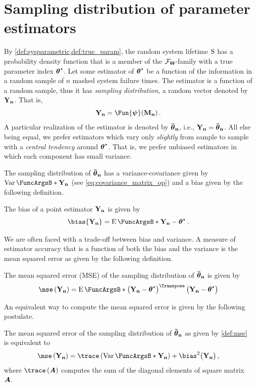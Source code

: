 \documentclass[
    11pt,
    extrafontsizes,
    article,
    oldfontcommands,
    final,
    oneside,
    openany,
    hidelinks]{memoir}
\begin{document}
\chapter{Sampling distribution of parameter estimators}
\label{sec:general_estimating_parameters:mle}
By \cref{def:sysparametric,def:true_param}, the random system lifetime $\mathrm{S}$ has a probability density function that is a member of the $\mathcal{F}_{\boldsymbol{\Theta}}$-family with a true parameter index ${\boldsymbol{\mathbf{\theta}}}^{\star}$. Let some estimator of ${\boldsymbol{\mathbf{\theta}}}^{\star}$ be a function of the information in a random sample of $n$ masked system failure times. The estimator is a function of a random sample, thus it has \emph{sampling distribution}, a random vector denoted by $\mathrm{\boldsymbol{\mathbf{Y_n}}}$. That is,
\begin{equation}
\sampdpt = \Fun{\vec{\psi}}(\mfs)\,.
\end{equation}
A particular realization of the estimator is denoted by $\boldsymbol{\mathbf{\bar{\boldsymbol{\mathbf{\theta}}}_{n}}}$, i.e., $\mathrm{\boldsymbol{\mathbf{Y_n}}} = \boldsymbol{\mathbf{\bar{\boldsymbol{\mathbf{\theta}}}_{n}}}$. All else being equal, we prefer estimators which vary only \emph{slightly} from sample to sample with a \emph{central tendency} around ${\boldsymbol{\mathbf{\theta}}}^{\star}$. That is, we prefer unbiased estimators in which each component has small variance.

The sampling distribution of $\boldsymbol{\mathbf{\bar{\boldsymbol{\mathbf{\theta}}}_{n}}}$ has a variance-covariance given by $\Var{\sampdpt}$ (see \cref{eq:covariance_matrix_op}) and a bias given by the following definition.
\begin{definition}
The bias of a point estimator $\mathrm{\boldsymbol{\mathbf{Y_n}}}$ is given by
\begin{equation}
    \bias{\sampdpt} = \Expect{\sampdpt} - \tparam\sysparamvec\,.
\end{equation}
\end{definition}
We are often faced with a trade-off between bias and variance. A measure of estimator accuracy that is a function of both the bias and the variance is the mean squared error as given by the following definition.
\begin{definition}
\label{def:mse}
The mean squared error (MSE) of the sampling distribution of $\boldsymbol{\mathbf{\bar{\boldsymbol{\mathbf{\theta}}}_{n}}}$ is given by
\begin{equation}
\label{eq:mse}
\mse \left( \sampdpt \right) = \Expect{
        \left (
            \sampdpt - \tparam\sysparamvec
        \right )^{\Transpose}
        \left (
            \sampdpt - \tparam\sysparamvec
        \right )}
\end{equation}
\end{definition}
An equivalent way to compute the mean squared error is given by the following postulate.
\begin{postulate}
The mean squared error of the sampling distribution of $\boldsymbol{\mathbf{\bar{\boldsymbol{\mathbf{\theta}}}_{n}}}$ as given by \cref{def:mse} is equivalent to
\begin{equation}
\label{eq:mse_bias_var}
\mse \left( \sampdpt \right) = \trace\left(\Var{\sampdpt}\right) +
    \bias^2 \bigl(\sampdpt \bigr)\,,
\end{equation}
where $\trace\left(\matrx{A}\right)$ computes the sum of the diagonal elements of square matrix $\boldsymbol{A}$.
\end{postulate}
\end{document}
